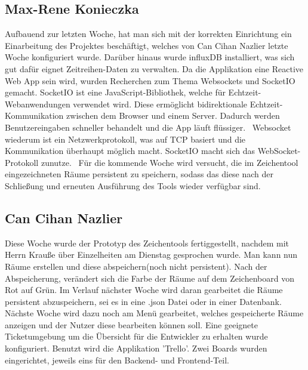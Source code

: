 \documentclass[]{article}
\begin{document}
\subsection{Max-Rene Konieczka}
Aufbauend zur letzten Woche, hat man sich mit der korrekten Einrichtung ein Einarbeitung des Projektes beschäftigt, welches von Can Cihan Nazlier letzte Woche konfiguriert wurde. Darüber hinaus wurde influxDB installiert, was sich gut dafür eignet Zeitreihen-Daten zu verwalten. Da die Applikation eine Reactive Web App sein wird, wurden Recherchen zum Thema Websockets und SocketIO gemacht. SocketIO ist eine JavaScript-Bibliothek, welche für Echtzeit-Webanwendungen verwendet wird. Diese ermöglicht bidirektionale Echtzeit-Kommunikation zwischen dem Browser und einem Server. Dadurch werden Benutzereingaben schneller behandelt und die App läuft flüssiger.~\cite{socketIO1, socketIO2} Websocket wiederum ist ein Netzwerkprotokoll, was auf TCP basiert und die Kommunikation überhaupt möglich macht. SocketIO macht sich das WebSocket-Protokoll zunutze.~\cite{webSocket1, webSocket2} Für die kommende Woche wird versucht, die im Zeichentool eingezeichneten Räume persistent zu speichern, sodass das diese nach der Schließung und erneuten Ausführung des Tools wieder verfügbar sind. 

\subsection{Can Cihan Nazlier}
Diese Woche wurde der Prototyp des Zeichentools fertiggestellt, nachdem mit Herrn Krauße über Einzelheiten am Dienstag gesprochen wurde. Man kann nun Räume erstellen und diese abspeichern(noch nicht persistent). Nach der Abspeicherung, verändert sich die Farbe der Räume auf dem Zeichenboard von Rot auf Grün. Im Verlauf nächster Woche wird daran gearbeitet die Räume persistent abzuspeichern, sei es in eine .json Datei oder in einer Datenbank. Nächste Woche wird dazu noch am Menü gearbeitet, welches gespeicherte Räume anzeigen und der Nutzer diese bearbeiten können soll. 
Eine geeignete Ticketumgebung um die Übersicht für die Entwickler zu erhalten wurde konfiguriert. Benutzt wird die Applikation 'Trello'. Zwei Boards wurden eingerichtet, jeweils eins für den Backend- und Frontend-Teil.

\printbibliography
\end{document}
